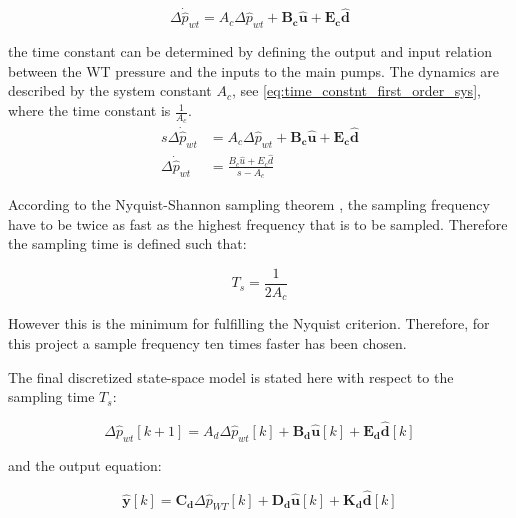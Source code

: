 \begin{equation*}
\Delta \dot{\hat{p}}_{wt} = A_c \Delta \hat{p}_{wt}  + \bm{B_c} \bm{\hat{u}} + \bm{E_c} \bm{\hat{d}} 
 \label{statespace_control_sys_state_22}
\end{equation*}

the time constant can be determined by defining the output and input relation between the WT pressure and the inputs to the main pumps. The dynamics are described by the system constant $A_c$, see \eqref{eq:time_constnt_first_order_sys}, where the time constant is $\frac{1}{A_c}$.
\begin{equation}
  \begin{split}
  s\Delta \dot{\hat{p}}_{wt} &= A_c \Delta \hat{p}_{wt}  + \bm{B_c} \bm{\hat{u}} + \bm{E_c} \bm{\hat{d}} \\
  \Delta \dot{\hat{p}}_{wt} &= \frac{B_c\hat{u}+E_c\hat{d}}{s-A_c}
  \end{split}
  \label{eq:time_constnt_first_order_sys}
\end{equation}

According to the Nyquist-Shannon sampling theorem \citep{franklin1994feedback},
the sampling frequency have to be twice as fast as the highest frequency that is to be sampled. Therefore the sampling time is defined such that:

\begin{equation}
T_s = \frac{1}{2A_c}
 \label{sampling}
\end{equation}

However this is the minimum for fulfilling the Nyquist criterion. Therefore, for this project a sample frequency ten times faster has been chosen.

The final discretized state-space model is stated here with respect to the sampling time $T_s$: 

 \begin{equation}
\Delta \hat{p}_{wt} [k+1] = A_d \Delta \hat{p}_{wt}[k]  + \bm{B_d} \bm{\hat{u}}[k] + \bm{E_d} \bm{\hat{d}}[k] 
 \label{statespace_discrete_state}
\end{equation}

and the output equation:

\begin{equation}
  \bm{\hat{y}}[k] = \bm{C_d} \Delta \hat{p}_{WT}[k] + \bm{D_d} \bm{\hat{u}}[k] + \bm{K_d} \bm{\hat{d}}[k]
\label{statespace_control_output_discrete}
\end{equation}

